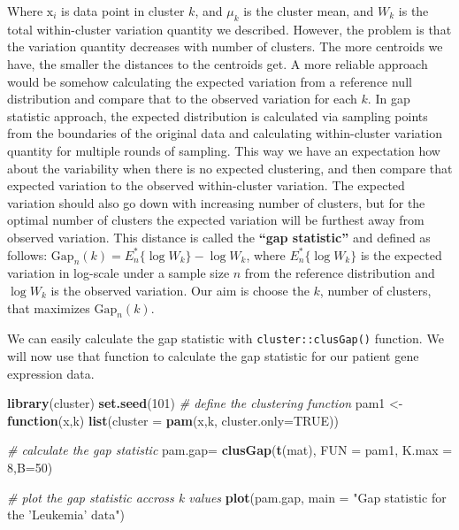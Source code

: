 \documentclass[12pt,]{krantz}
\newenvironment{Shaded}{\begin{snugshade}}{\end{snugshade}}
\newcommand{\CommentTok}[1]{\textcolor[rgb]{0.56,0.35,0.01}{\textit{#1}}}
\newcommand{\ControlFlowTok}[1]{\textcolor[rgb]{0.13,0.29,0.53}{\textbf{#1}}}
\newcommand{\DataTypeTok}[1]{\textcolor[rgb]{0.13,0.29,0.53}{#1}}
\newcommand{\DecValTok}[1]{\textcolor[rgb]{0.00,0.00,0.81}{#1}}
\newcommand{\KeywordTok}[1]{\textcolor[rgb]{0.13,0.29,0.53}{\textbf{#1}}}
\newcommand{\NormalTok}[1]{#1}
\newcommand{\OtherTok}[1]{\textcolor[rgb]{0.56,0.35,0.01}{#1}}
\newcommand{\StringTok}[1]{\textcolor[rgb]{0.31,0.60,0.02}{#1}}
\theoremstyle{definition}
\theoremstyle{definition}
\theoremstyle{definition}
\theoremstyle{remark}
\begin{document}
Where \(\mathrm{x}_i\) is data point in cluster \(k\), and \(\mu_k\) is
the cluster mean, and \(W_k\) is the total within-cluster variation
quantity we described. However, the problem is that the variation
quantity decreases with number of clusters. The more centroids we have,
the smaller the distances to the centroids get. A more reliable approach
would be somehow calculating the expected variation from a reference
null distribution and compare that to the observed variation for each
\(k\). In gap statistic approach, the expected distribution is
calculated via sampling points from the boundaries of the original data
and calculating within-cluster variation quantity for multiple rounds of
sampling. This way we have an expectation how about the variability when
there is no expected clustering, and then compare that expected
variation to the observed within-cluster variation. The expected
variation should also go down with increasing number of clusters, but
for the optimal number of clusters the expected variation will be
furthest away from observed variation. This distance is called the
\textbf{``gap statistic''} and defined as follows:
\(\displaystyle \mathrm{Gap}_n(k) = E_n^*\{\log W_k\} - \log W_k\),
where \(E_n^*\{\log W_k\}\) is the expected variation in log-scale under
a sample size \(n\) from the reference distribution and \(\log W_k\) is
the observed variation. Our aim is choose the \(k\), number of clusters,
that maximizes \(\mathrm{Gap}_n(k)\).

We can easily calculate the gap statistic with
\texttt{cluster::clusGap()} function. We will now use that function to
calculate the gap statistic for our patient gene expression data.

\begin{Shaded}
\begin{Highlighting}[]
\KeywordTok{library}\NormalTok{(cluster)}
\KeywordTok{set.seed}\NormalTok{(}\DecValTok{101}\NormalTok{)}
\CommentTok{# define the clustering function}
\NormalTok{pam1 <-}\StringTok{ }\ControlFlowTok{function}\NormalTok{(x,k) }
  \KeywordTok{list}\NormalTok{(}\DataTypeTok{cluster =} \KeywordTok{pam}\NormalTok{(x,k, }\DataTypeTok{cluster.only=}\OtherTok{TRUE}\NormalTok{))}

\CommentTok{# calculate the gap statistic}
\NormalTok{pam.gap=}\StringTok{ }\KeywordTok{clusGap}\NormalTok{(}\KeywordTok{t}\NormalTok{(mat), }\DataTypeTok{FUN =}\NormalTok{ pam1, }\DataTypeTok{K.max =} \DecValTok{8}\NormalTok{,}\DataTypeTok{B=}\DecValTok{50}\NormalTok{)}

\CommentTok{# plot the gap statistic accross k values}
\KeywordTok{plot}\NormalTok{(pam.gap, }\DataTypeTok{main =} \StringTok{"Gap statistic for the 'Leukemia' data"}\NormalTok{)}
\end{Highlighting}
\end{Shaded}
\end{document}
